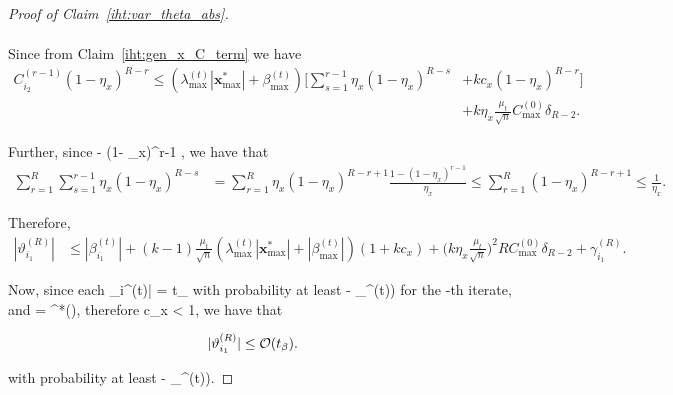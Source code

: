 \documentclass{article}
\newcommand{\siri}[1]{{\color{black}{#1}}}
\def\[#1\]{{$#1$}}
\def\b#1{{\mathbf{#1}}}
\begin{document}
\begin{proof}[Proof of Claim~\ref{iht:var_theta_abs}]
\begin{align*}
	
	\end{align*}
	
	Since from Claim~\ref{iht:gen_x_C_term} we have 
	\begin{align*}
	C_{i_2}^{(r-1)} (1- \eta_x)^{{R} - r}
	\leq (\lambda^{(t)}_{\max} |\b{x}_{\max}^*| +\beta^{(t)}_{\max}) \big[ \textstyle\sum\limits_{s=1}^{r-1}\eta_x(1- \eta_x)^{{R} - s} &+ 
	kc_x(1- \eta_x)^{{R} - r}\big] \\ &+ k\eta_x\tfrac{\mu_t}{\sqrt{n}}C_{\max}^{(0)} \delta_{{R}-2}.
	\end{align*}
	
	
	
	
	
	
	
	
	
	Further, since \[1 - (1- \eta_x)^{r-1} \], we have that
	\begin{align*}
	\textstyle\sum\limits_{r = 1}^{R } 	\textstyle\sum\limits_{s=1}^{r-1}\eta_x(1- \eta_x)^{{R} - s } &= \textstyle\sum\limits_{r = 1}^{R } \eta_x(1- \eta_x)^{{R} - r + 1} \frac{1 - (1- \eta_x)^{r-1} }{\eta_x}
	\leq  \textstyle\sum\limits_{r = 1}^{R }(1- \eta_x)^{{R} - r + 1}

	\leq \tfrac{1}{\eta_x}.
	\end{align*}
	
	Therefore,
	\begin{align*}
	|\vartheta^{(R)}_{i_1}| 
	&\leq |\beta^{(t)}_{i_1}| + (k-1)\tfrac{\mu_t}{\sqrt{n}}(\lambda^{(t)}_{\max} |\b{x}_{\max}^*| +|\beta^{(t)}_{\max}|) (1 + 
	kc_x)  + \big(k\eta_x\tfrac{\mu_t}{\sqrt{n}}\big)^2{R}C_{\max}^{(0)} \delta_{{R}-2} + \gamma^{(R)}_{i_1}.

	\end{align*}
	
	Now, since each \[|\beta_i^{(t)}| = t_\beta\] with probability at least \[( 1- \delta_{\beta}^{(t)})\] for the \[t\]-th iterate, and \[ k = ^*()\], therefore \[kc_x < 1\], we have that 
	
	
	
	
	
	
	
	
	
	
	
	
	
	
	\begin{align*}
	|\vartheta^{(R)}_{i_1}| 

	& \leq  \siri{\mathcal{O}(t_{\beta})}.
	\end{align*}
	
	with probability at least \[( 1- \delta_{\beta}^{(t)})\].
\end{proof}
\end{document}
